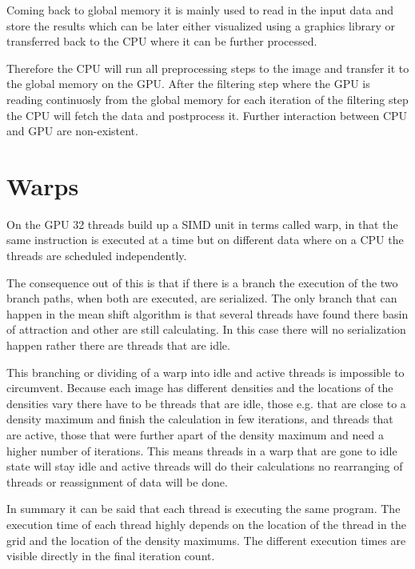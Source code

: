 Coming back to global memory it is mainly used to read in the input data and
store the results which can be later either visualized using a graphics library
or transferred back to the \gls{CPU} where it can be further processed. 

Therefore the \gls{CPU} will run all preprocessing steps to the image and
transfer it to the global memory on the \gls{GPU}. After the filtering step
where the \gls{GPU} is reading continuosly from the global memory for each
iteration of the filtering step the \gls{CPU} will fetch the data and
postprocess it. Further interaction between \gls{CPU} and \gls{GPU} are
non-existent.


\section{Warps} %
\label{sec:warps}

On the \gls{GPU} 32 threads build up a \gls{SIMD} unit in 
terms called warp, in that the same instruction is executed at a time but on
different data where on a \gls{CPU} the threads are scheduled independently. 

The consequence out of this is that if there is a branch the execution of the
two branch paths, when both are executed, are serialized. The only branch that
can happen in the mean shift algorithm is that several threads have found there
basin of attraction and other are still calculating. In this case there will no
serialization happen rather there are threads that are idle.

This branching or dividing of a warp into idle and active threads is impossible
to circumvent. Because each image has different densities and the locations
of the densities vary there have to be threads that are idle, those e.g. that
are close to a density maximum and finish the calculation in few iterations,
and threads that are active, those that were further apart of the density maximum
and need a higher number of iterations. This means threads in a warp that
are gone to idle state will stay idle and active threads will do their 
calculations no rearranging of threads or reassignment of data will be done. 

In summary it can be said that each thread is executing the same program. The 
execution time of each thread highly depends on the location of the thread in
the grid and the location of the density maximums. The different execution times
are visible directly in the final iteration count. 

